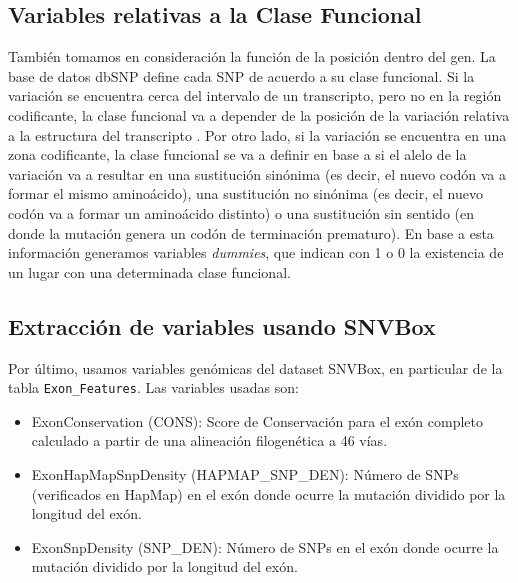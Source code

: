\subsection{Variables relativas a la Clase Funcional}

También tomamos en consideración la función de la posición dentro del gen. La base de datos dbSNP define cada SNP de acuerdo a su clase funcional. Si la variación se encuentra cerca del intervalo de un transcripto, pero no en la región codificante, la clase funcional va a depender de la posición de la variación relativa a la estructura del transcripto \cite{Ostell2007}.  Por otro lado, si la variación se encuentra en una zona codificante, la clase funcional se va a definir en base a si el alelo de la variación va a resultar en una sustitución sinónima (es decir, el nuevo codón va a formar el mismo aminoácido), una sustitución no sinónima (es decir, el nuevo codón va a formar un aminoácido distinto) o una sustitución sin sentido (en donde la mutación genera un codón de terminación prematuro). En base a esta información generamos variables \textit{dummies}, que indican con 1 o 0 la existencia de un lugar con una determinada clase funcional.


 

\subsection{Extracción de variables usando SNVBox}

Por último, usamos variables genómicas del dataset SNVBox, en particular de la tabla \texttt{Exon\_Features}. Las variables usadas son:
\begin{itemize}
    \item ExonConservation (CONS): Score de Conservación para el exón completo calculado a partir de una alineación filogenética a 46 vías.
    \item ExonHapMapSnpDensity (HAPMAP\_SNP\_DEN): Número de SNPs (verificados en HapMap) en el exón donde ocurre la mutación dividido por la longitud del exón.
    \item ExonSnpDensity (SNP\_DEN): Número de SNPs en el exón donde ocurre la mutación dividido por la longitud del exón.
\end{itemize}


